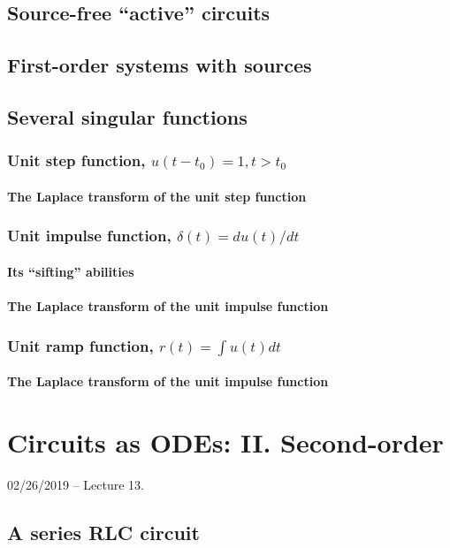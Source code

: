 \documentclass[11pt]{book}
\begin{document}
\section{Source-free ``active'' circuits}
\section{First-order systems with sources}
\section{Several singular functions}
\subsection{Unit step function, $u(t-t_0) = 1, t>t_0$}
\subsubsection{The Laplace transform of the unit step function}
\subsection{Unit impulse function, $\delta(t) = du(t)/dt$}
\subsubsection{Its ``sifting'' abilities}
\subsubsection{The Laplace transform of the unit impulse function}
\subsection{Unit ramp function, $r(t) = \int u(t)dt $}
\subsubsection{The Laplace transform of the unit impulse function}



\chapter{Circuits as ODEs: II. Second-order}
02/26/2019 – Lecture 13. 
\section{A series RLC circuit}
\end{document}
